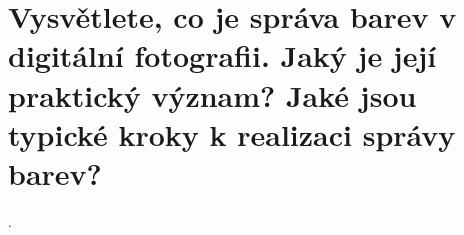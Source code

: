 \section{Vysvětlete, co je správa barev v digitální fotografii. Jaký je její praktický význam? Jaké jsou typické kroky 
k realizaci správy barev?}.